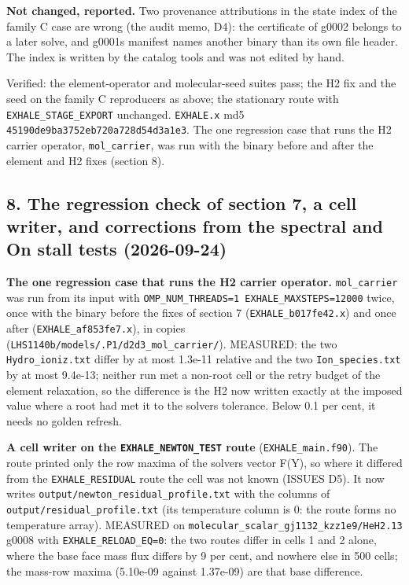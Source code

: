 \documentclass[english,a4paper]{my_memo}
\begin{document}
\textbf{Not changed, reported.} Two provenance attributions in the state index of
the family C case are wrong (the audit memo, D4): the certificate of g0002
belongs to a later solve, and g0001\textquotesingle s manifest names another binary than its
own file header. The index is written by the catalog tools and was not edited
by hand.

Verified: the element-operator and molecular-seed suites pass; the H2 fix
and the seed on the family C reproducers as above; the stationary route with
\texttt{EXHALE\_STAGE\_EXPORT} unchanged. \texttt{EXHALE.x} md5
\texttt{45190de9ba3752eb720a728d54d3a1e3}. The one regression case that runs the H2
carrier operator, \texttt{mol\_carrier}, was run with the binary before and after the
element and H2 fixes (section 8).

\subsection{8. The regression check of section 7, a cell writer, and corrections from the spectral and On stall tests (2026-09-24)}\label{8-the-regression-check-of-section-7-a-cell-writer-and-corrections-from-the-spectral-and-on-stall-tests-2026-09-24}

\textbf{The one regression case that runs the H2 carrier operator.} \texttt{mol\_carrier}
was run from its input with \texttt{OMP\_NUM\_THREADS=1\ EXHALE\_MAXSTEPS=12000} twice,
once with the binary before the fixes of section 7 (\texttt{EXHALE\_b017fe42.x}) and
once after (\texttt{EXHALE\_af853fe7.x}), in copies
(\texttt{LHS1140b/models/.P1/d2d3\_mol\_carrier/}). MEASURED: the two
\texttt{Hydro\_ioniz.txt} differ by at most 1.3e-11 relative and the two
\texttt{Ion\_species.txt} by at most 9.4e-13; neither run met a non-root cell or the
retry budget of the element relaxation, so the difference is the H2 now
written exactly at the imposed value where a root had met it to the solver\textquotesingle s
tolerance. Below 0.1 per cent, it needs no golden refresh.

\textbf{A cell writer on the \texttt{EXHALE\_NEWTON\_TEST} route} (\texttt{EXHALE\_main.f90}). The
route printed only the row maxima of the solver\textquotesingle s vector F(Y), so where it
differed from the \texttt{EXHALE\_RESIDUAL} route the cell was not known (ISSUES D5).
It now writes \texttt{output/newton\_residual\_profile.txt} with the columns of
\texttt{output/residual\_profile.txt} (its temperature column is 0: the route forms no
temperature array). MEASURED on \texttt{molecular\_scalar\_gj1132\_kzz1e9/HeH2.13} g0008
with \texttt{EXHALE\_RELOAD\_EQ=0}: the two routes differ in cells 1 and 2 alone, where
the base face mass flux differs by 9 per cent, and nowhere else in 500 cells;
the mass-row maxima (5.10e-09 against 1.37e-09) are that base difference.
\end{document}
